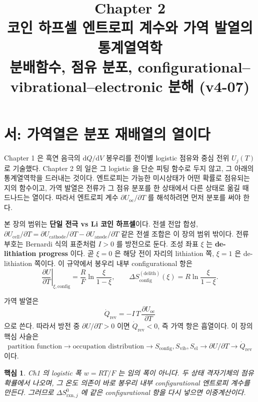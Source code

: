 \documentclass[11pt,a4paper]{article}
\title{\textbf{\LARGE Chapter 2}\\[0.35em]
\Large 코인 하프셀 엔트로피 계수와 가역 발열의 통계열역학\\[0.2em]
\large 분배함수, 점유 분포, configurational--vibrational--electronic 분해 (v4-07)}
\author{}
\date{}
\newtheorem*{keybox}{핵심}
\newcommand{\dd}{\mathrm{d}}
\newcommand{\rxn}{\mathrm{rxn}}
\newcommand{\rev}{\mathrm{rev}}
\newcommand{\oc}{\mathrm{oc}}
\newcommand{\config}{\mathrm{config}}
\newcommand{\vib}{\mathrm{vib}}
\newcommand{\el}{\mathrm{el}}
\begin{document}
\maketitle
\tableofcontents
\newpage

\section*{서: 가역열은 분포 재배열의 열이다}
Chapter 1 은 흑연 음극의 $\dd Q/\dd V$ 봉우리를 전이별 logistic 점유와 중심 전위
$U_j(T)$ 로 기술했다. Chapter 2 의 일은 그 logistic 을 단순 피팅 함수로 두지 않고,
그 아래의 통계열역학을 드러내는 것이다. 엔트로피는 가능한 미시상태가 어떤 확률로 점유되는지의
함수이고, 가역 발열은 전류가 그 점유 분포를 한 상태에서 다른 상태로 옮길 때 드나드는 열이다.
따라서 엔트로피 계수 $\partial U_\oc/\partial T$ 를 해석하려면 먼저 분포를 써야 한다.

본 장의 범위는 \textbf{단일 전극 vs Li 코인 하프셀}이다. 전셀 전압 합성,
$\partial U_\mathrm{cell}/\partial T=\partial U_\mathrm{cathode}/\partial T
-\partial U_\mathrm{anode}/\partial T$ 같은 전셀 조합은 이 장의 범위 밖이다. 전류 부호는
Bernardi 식의 표준처럼 $I>0$ 를 방전으로 둔다. 조성 좌표 $\xi$ 는 \textbf{de-lithiation progress}
이다. 곧 $\xi=0$ 은 해당 전이 자리의 lithiation 쪽, $\xi=1$ 은 de-lithiation 쪽이다.
이 규약에서 봉우리 내부 configurational 항은
\begin{equation}
\left.\frac{\partial U}{\partial T}\right|_{\xi,\config}
  = \frac{R}{F}\ln\frac{\xi}{1-\xi},
\qquad
\Delta S_{\config}^{(\mathrm{delith})}(\xi)
  = R\ln\frac{\xi}{1-\xi}.
\label{eq:sign_config_intro}
\end{equation}

가역 발열은
\begin{equation}
\boxed{\;\dot Q_\rev=-I\,T\,\frac{\partial U_\oc}{\partial T}\;}
\label{eq:qrev_intro}
\end{equation}
으로 쓴다. 따라서 방전 중 $\partial U/\partial T>0$ 이면 $\dot Q_\rev<0$,
즉 가역 항은 흡열이다. 이 장의 핵심 사슬은
\[
\boxed{\text{partition function}\rightarrow \text{occupation distribution}\rightarrow
S_{\config},S_{\vib},S_{\el}\rightarrow \partial U/\partial T\rightarrow \dot Q_\rev}
\]
이다.

\begin{keybox}
Ch1 의 logistic 폭 $w=RT/F$ 는 임의 폭이 아니다. 두 상태 격자기체의 점유 확률에서 나오며,
그 온도 의존이 바로 봉우리 내부 configurational 엔트로피 계수를 만든다. 그러므로
$\Delta S_{\rxn,j}^0$ 에 같은 configurational 항을 다시 넣으면 이중계산이다.
\end{keybox}
\end{document}
